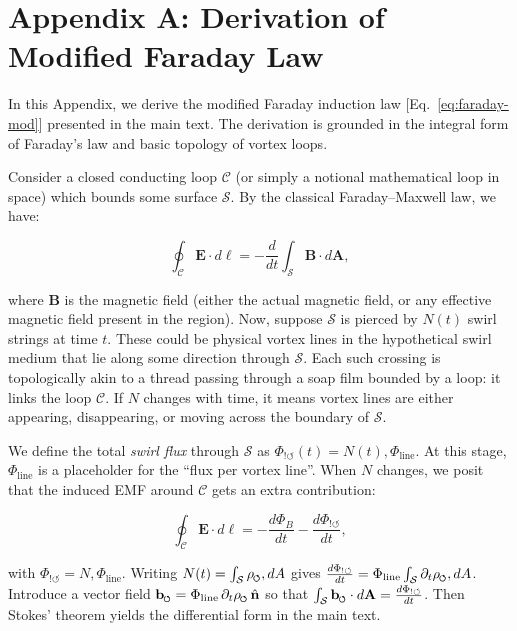 \documentclass[12pt]{article}
\DeclareRobustCommand{\swirlarrow}{
\mathchoice{\mkern-2mu\scriptstyle\boldsymbol{\circlearrowleft}}%
{\mkern-2mu\scriptstyle\boldsymbol{\circlearrowleft}}%
{\mkern-2mu\scriptscriptstyle\boldsymbol{\circlearrowleft}}%
{\mkern-2mu\scriptscriptstyle\boldsymbol{\circlearrowleft}}
}%
\begin{document}
\appendix

\section*{Appendix A: Derivation of Modified Faraday Law}\label{app:Faraday}

In this Appendix, we derive the modified Faraday induction law [Eq.~\eqref{eq:faraday-mod}] presented in the main text. The derivation is grounded in the integral form of Faraday's law and basic topology of vortex loops.


Consider a closed conducting loop $\mathcal{C}$ (or simply a notional mathematical loop in space) which bounds some surface $\mathcal{S}$. By the classical Faraday–Maxwell law, we have:

\begin{equation}\label{eq:faraday-integral}

\oint_{\mathcal{C}} \mathbf{E}\cdot d\boldsymbol{\ell} = -\frac{d}{dt}\int_{\mathcal{S}} \mathbf{B}\cdot d\mathbf{A},
\end{equation}

where $\mathbf{B}$ is the magnetic field (either the actual magnetic field, or any effective magnetic field present in the region). Now, suppose $\mathcal{S}$ is pierced by $N(t)$ swirl strings at time $t$. These could be physical vortex lines in the hypothetical swirl medium that lie along some direction through $\mathcal{S}$. Each such crossing is topologically akin to a thread passing through a soap film bounded by a loop: it links the loop $\mathcal{C}$. If $N$ changes with time, it means vortex lines are either appearing, disappearing, or moving across the boundary of $\mathcal{S}$.


We define the total \emph{swirl flux} through $\mathcal{S}$ as $\Phi_{!\circlearrowleft}(t) = N(t),\Phi_\text{line}$. At this stage, $\Phi_\text{line}$ is a placeholder for the ``flux per vortex line''. When $N$ changes, we posit that the induced EMF around $\mathcal{C}$ gets an extra contribution:

\begin{equation}\label{eq:app-faraday-mod-int}

\oint_{\mathcal{C}} \mathbf{E}\cdot d\boldsymbol{\ell} = -\frac{d\Phi_{B}}{dt} - \frac{d\Phi_{!\circlearrowleft}}{dt},
\end{equation}

with $\Phi_{!\circlearrowleft} = N,\Phi_\text{line}$. Writing $N(t)=\int_{\mathcal{S}}\rho_{\swirlarrow},dA$ gives $\frac{d\Phi_{!\circlearrowleft}}{dt}=\Phi_\text{line}\int_{\mathcal S}\partial_t\rho_{\swirlarrow},dA$. Introduce a vector field $\mathbf{b}_{\swirlarrow} = \Phi_\text{line} \, \partial_t \rho_{\swirlarrow} \, \hat{\mathbf n}$ so that $\int_{\mathcal S} \mathbf{b}_{\swirlarrow} \cdot d\mathbf{A} = \frac{d\Phi_{!\circlearrowleft}}{dt}$. Then Stokes' theorem yields the differential form in the main text.
\end{document}

